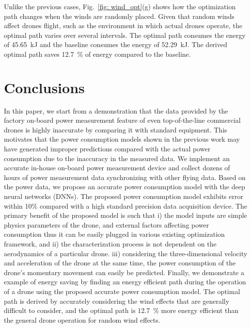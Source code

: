 \documentclass[journal]{./template/IEEEtran}
\begin{document}
Unlike the previous cases, Fig.~\ref{fig: wind_opt}(g) shows how the optimization path changes when the winds are randomly placed.
Given that random winds affect drones flight, such as the environment in which actual drones operate, the optimal path varies over several intervals. The optimal path consumes the energy of 45.65~kJ and the baseline consumes the energy of 52.29~kJ. The derived optimal path saves 12.7~\% of energy compared to the baseline.










\section{Conclusions}
In this paper, we start from a demonstration that the data provided by the factory on-board power measurement feature of even top-of-the-line commercial drones is highly inaccurate by comparing it with standard equipment. 
This motivates that the power consumption models shown in the previous work may have generated improper predictions compared with the actual power consumption due to the inaccuracy in the measured data.
We implement an accurate in-house on-board power measurement device and collect dozens of hours of power measurement data synchronizing with other flying data. 
Based on the power data, we propose an accurate power consumption model with the deep neural networks (DNNs). 
The proposed power consumption model exhibits error within 10\% compared with a high standard precision data acquisition device. 
The primary benefit of the proposed model is such that i) the model inputs are simple physics parameters of the drone, and external factors affecting power consumption thus it can be easily plugged in various existing optimization framework, and ii) the characterization process is not dependent on the aerodynamics of a particular drone. iii) considering the three-dimensional velocity and acceleration of the drone at the same time, the power consumption of the drone's momentary movement can easily be predicted.
Finally, we demonstrate a example of energy saving by finding an energy efficient path during the operation of a drone using the proposed accurate power consumption model. The optimal path is derived by accurately considering the wind effects that are generally difficult to consider, and the optimal path is 12.7~\% more energy efficient than the general drone operation for random wind effects.
\end{document}
